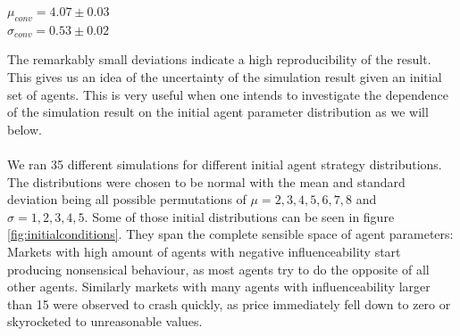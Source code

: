 \documentclass[11pt]{article}
\begin{document}
\begin{center}
  $\mu_{conv} = 4.07\pm 0.03$ \\
  $\sigma_{conv} = 0.53\pm 0.02$
\end{center}
The remarkably small deviations indicate a high reproducibility of the result. This gives us an idea of the uncertainty of the simulation result given an initial set of agents. This is very useful when one intends to investigate the dependence of the simulation result on the initial agent parameter distribution as we will below. \\
\hfill \\
We ran 35 different simulations for different initial agent strategy distributions. The distributions were chosen to be normal with the mean and standard deviation being all possible permutations of $\mu=2,3,4,5,6,7,8$ and $\sigma=1,2,3,4,5$. Some of those initial distributions can be seen in figure \ref{fig:initialconditions}. They span the complete sensible space of agent parameters: Markets with high amount of agents with negative influenceability start producing nonsensical behaviour, as most agents try to do the opposite of all other agents. Similarly markets with many agents with influenceability larger than 15 were observed to crash quickly, as price immediately fell down to zero or skyrocketed to unreasonable values. \\
\end{document}
